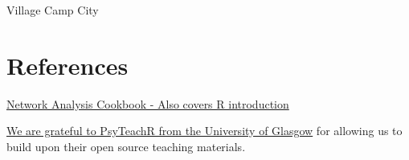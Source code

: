 \documentclass[]{book}
\begin{document}
 Village Camp City

\appendix


\chapter{References}\label{references}

\href{http://sachaepskamp.com/files/Cookbook.html}{Network Analysis
Cookbook - Also covers R introduction}

\href{https://psyteachr.github.io/}{We are grateful to PsyTeachR from
the University of Glasgow} for allowing us to build upon their open
source teaching materials.


\end{document}
